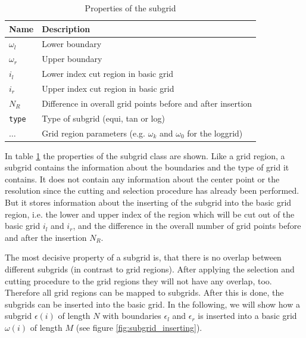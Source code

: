 \begin{table}[h]
	\begin{center}
		\begin{tabular}{ll}
		Name & Description \\ 
		\hline
		$\omega_l$  & Lower boundary \\
		$\omega_r$  & Upper boundary \\
		$i_l$       & Lower index cut region in basic grid \\
		$i_r$       & Upper index cut region in basic grid \\
		$N_R$       & Difference in overall grid points before and after insertion \\
		\texttt{type}  & Type of subgrid (equi, tan or log)\\
		$\dots$ & Grid region parameters (e.g. $\omega_k$ and $\omega_0$ for the loggrid) \\
		\end{tabular}
	\end{center}
	\caption{Properties of the subgrid}
	\label{tab:subgrid}
\end{table}

In table \ref{tab:subgrid} the properties of the subgrid class are shown. Like a grid region, a subgrid contains the information about the boundaries and the type of grid it contains. It does not contain any information about the center point or the resolution since the cutting and selection procedure has already been performed. But it stores information about the inserting of the subgrid into the basic grid region, i.e. the lower and upper index of the region which will be cut out of the basic grid $i_l$ and $i_r$, and the difference in the overall number of grid points before and after the insertion $N_{R}$. 

The most decisive property of a subgrid is, that there is no overlap between different subgrids (in contrast to grid regions). After applying the selection and cutting procedure to the grid regions they will not have any overlap, too. Therefore all grid regions can be mapped to subgrids. After this is done, the subgrids can be inserted into the basic grid. In the following, we will show how a subgrid $\epsilon(i)$ of length $N$ with boundaries $\epsilon_l$ and $\epsilon_r$ is inserted into a basic grid $\omega(i)$ of length $M$ (see figure \ref{fig:subgrid_inserting}). 

